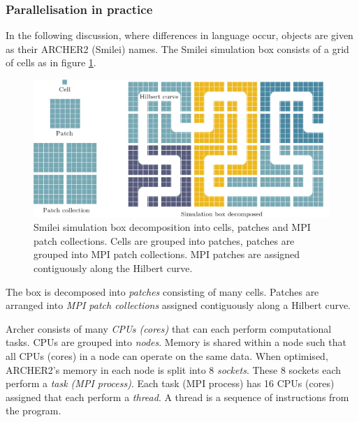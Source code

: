 \subsubsection{Parallelisation in practice}
In the following discussion, where differences in language occur, objects are given as their ARCHER2 (Smilei) names. The Smilei simulation box consists of a grid of cells as in figure \ref{fig:introsmileiparallelisation}.
\begin{figure}
	\centering
	\includegraphics[width=1\linewidth]{figures/intro/intro_smilei_parallelisation}
	\caption[Smilei simulation box decomposition into cells, patches and MPI patch collections.]{Smilei simulation box decomposition into cells, patches and MPI patch collections. Cells are grouped into patches, patches are grouped into MPI patch collections. MPI patches are assigned contiguously along the Hilbert curve.}
	\label{fig:introsmileiparallelisation}
\end{figure}
The box is decomposed into \textit{patches} consisting of many cells. Patches are arranged into \textit{MPI patch collections} assigned contiguously along a Hilbert curve.

Archer consists of many \textit{CPUs (cores)} that can each perform computational tasks. CPUs are grouped into \textit{nodes}. Memory is shared within a node such that all CPUs (cores) in a node can operate on the same data. When optimised, ARCHER2’s memory in each node is split into 8 \textit{sockets}. These 8 sockets each perform a \textit{task (MPI process)}. Each task (MPI process) has 16 CPUs (cores) assigned that each perform a \textit{thread}. A thread is a sequence of instructions from the program.

